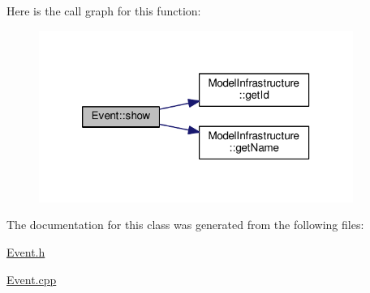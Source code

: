 Here is the call graph for this function\-:
\nopagebreak
\begin{figure}[H]
\begin{center}
\leavevmode
\includegraphics[width=290pt]{class_event_a640f132001d454af52cb0d0e20ebb856_cgraph}
\end{center}
\end{figure}




The documentation for this class was generated from the following files\-:\begin{DoxyCompactItemize}
\item 
\hyperlink{_event_8h}{Event.\-h}\item 
\hyperlink{_event_8cpp}{Event.\-cpp}\end{DoxyCompactItemize}
